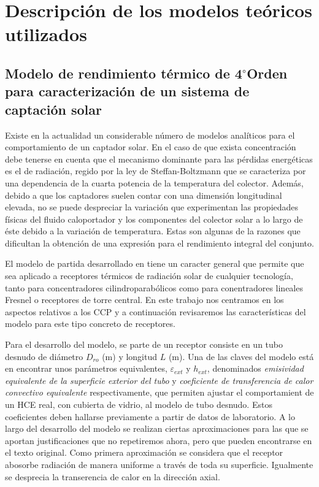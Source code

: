 \chapter{Descripción de los modelos teóricos utilizados}
\label{descripcionmodelos}

\section{Modelo de rendimiento térmico de 4$^{\circ}$Orden para caracterización de un sistema de captación solar}

Existe en la actualidad un considerable número de modelos analíticos para el comportamiento de un captador solar.  En el caso de que exista concentración debe tenerse en cuenta que el mecanismo dominante para las pérdidas energéticas es el de radiación, regido por la ley de Steffan-Boltzmann que se caracteriza por una dependencia de la cuarta potencia de la temperatura del colector.  Además, debido a que los captadores suelen contar con una dimensión longitudinal elevada, no se puede despreciar la variación que experimentan las propiedades físicas del fluido caloportador y los componentes del colector solar a lo largo de éste debido a la variación de temperatura. Estas son algunas de la razones que dificultan la obtención de una expresión para el rendimiento integral del conjunto. 

El modelo de partida desarrollado en \cite{barberofresnoDesarrolloModeloTeorico2018} tiene un caracter general que permite que sea aplicado a receptores térmicos de radiación solar de cualquier tecnología, tanto para concentradores cilindroparabólicos como para conentradores lineales Fresnel o receptores de torre central. En este trabajo nos centramos en los aspectos relativos a los CCP y a continuación revisaremos las características del modelo para este tipo concreto de receptores.

Para el desarrollo del modelo, se parte de un receptor consiste en un tubo desnudo de diámetro \(D_{ro}\) (m) y longitud \(L\) (m). Una de las claves del modelo está en encontrar unos parámetros equivalentes, \(\varepsilon_{ext}\) y \(h_{ext}\),  denominados \textit{emisividad equivalente de la superficie exterior del tubo} y \textit{coeficiente de transferencia de calor convectivo equivalente} respectivamente, que permiten ajustar el comportamient de un HCE real, con cubierta de vidrio, al modelo de tubo desnudo. Estos coeficientes deben hallarse previamente a partir de datos de laboratorio. A lo largo del desarrollo del modelo se realizan ciertas aproximaciones para las que se aportan justificaciones que no repetiremos ahora, pero que pueden encontrarse en el texto original. Como primera aproximación se considera que el receptor abosorbe radiación de manera uniforme a través de toda su superficie. Igualmente se desprecia la transerencia de calor en la dirección axial.

